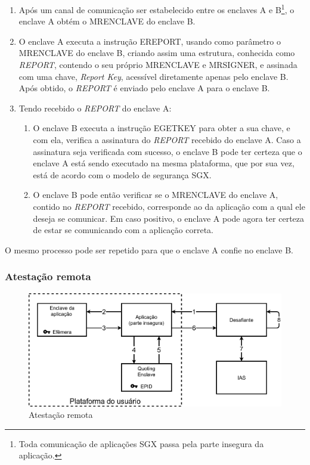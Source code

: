 \begin{enumerate}
    \item Após um canal de comunicação ser estabelecido entre os enclaves A e
    B\footnote{\label{notacomunicacao}Toda comunicação de aplicações SGX passa
    pela parte insegura da aplicação.}, o enclave A obtém o MRENCLAVE do enclave
    B.

    \item O enclave A executa a instrução EREPORT, usando como parâmetro o
    MRENCLAVE do enclave B, criando assim uma estrutura, conhecida como
    \textit{REPORT}, contendo o seu próprio MRENCLAVE e MRSIGNER, e assinada com
    uma chave, \textit{Report Key}, acessível diretamente apenas pelo enclave B.
    Após obtido, o \textit{REPORT} é enviado pelo enclave A para o enclave B.

    \item Tendo recebido o \textit{REPORT} do enclave A:

    \begin{enumerate}
        \item O enclave B executa a instrução EGETKEY para obter a sua chave, e
        com ela, verifica a assinatura do \textit{REPORT} recebido do enclave A.
        Caso a assinatura seja verificada com sucesso, o enclave B pode ter
        certeza que o enclave A está sendo executado na mesma plataforma, que
        por sua vez, está de acordo com o modelo de segurança SGX.

        \item O enclave B pode então verificar se o MRENCLAVE do enclave A,
        contido no \textit{REPORT} recebido, corresponde ao da aplicação com a
        qual ele deseja se comunicar. Em caso positivo, o enclave A pode agora
        ter certeza de estar se comunicando com a aplicação correta.
    \end{enumerate}

\end{enumerate}

O mesmo processo pode ser repetido para que o enclave A confie no enclave B.

\subsubsection{Atestação remota}
\label{subsubsec:sgx_funcionalidades_atestacao_enclaves_remota}

\begin{figure}[ht]
\centering
\includegraphics[width=5in]{img/atestacao_remota_pt_BR}
\caption{Atestação remota}
\label{fig:atestacaoremota}
\end{figure}

